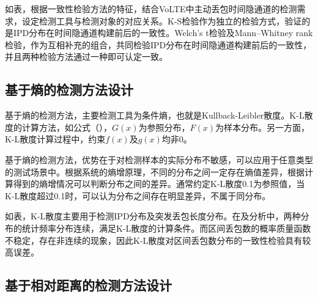 如表，根据一致性检验方法的特征，结合VoLTE中主动丢包时间隐通道的检测需求，设定检测工具与检测对象的对应关系。K-S检验作为独立的检验方式，验证的是IPD分布在时间隐通道构建前后的一致性。Welch's t检验及Mann–Whitney rank检验，作为互相补充的组合，共同检验IPD分布在时间隐通道构建前后的一致性，并且两种检验方法通过一种即可认定一致。

\subsection{基于熵的检测方法设计}
\label{chap:analyze:statistical:entropy}

基于熵的检测方法，主要检测工具为条件熵，也就是Kullback-Leibler散度。K-L散度的计算方法，如公式（），$G(x)$为参照分布，$F(x)$为样本分布。另一方面，K-L散度计算过程中，约束$f(x)$及$g(x)$均非0。

基于熵的检测方法，优势在于对检测样本的实际分布不敏感，可以应用于任意类型的测试场景中。根据系统的熵增原理，不同的分布之间一定存在熵值差异，根据计算得到的熵增情况可以判断分布之间的差异。通常约定K-L散度0.1为参照值，当K-L散度超过0.1时，可以认为分布之间存在明显差异，不属于同分布。


如表，K-L散度主要用于检测IPD分布及突发丢包长度分布。在及分析中，两种分布的统计频率分布连续，满足K-L散度的计算条件。而区间丢包数的概率质量函数不稳定，存在非连续的现象，因此K-L散度对区间丢包数分布的一致性检验具有较高误差。

\subsection{基于相对距离的检测方法设计}
\label{chap:analyze:statistical:distance}

